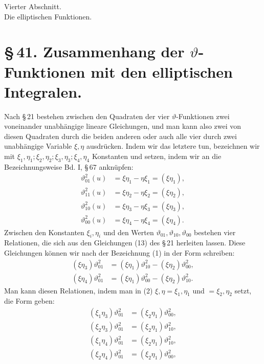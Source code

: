 \documentclass[11pt]{article}
\providecommand{\tht}{\vartheta}
\begin{document}
\begin{center}
{\large Vierter Abschnitt.}\\[0.7em]
{\Large Die elliptischen Funktionen.}
\end{center}

\section*{\S\,41. Zusammenhang der $\vartheta$-Funktionen mit den elliptischen Integralen.}

Nach \S\,21 bestehen zwischen den Quadraten der vier $\vartheta$-Funktionen zwei voneinander unabhängige lineare Gleichungen, und man kann also zwei von diesen Quadraten durch die beiden anderen oder auch alle vier durch zwei unabhängige Variable $\xi,\eta$ ausdrücken. Indem wir das letztere tun, bezeichnen wir mit $\xi_1,\eta_1;\xi_2,\eta_2;\xi_3,\eta_3;\xi_4,\eta_4$ Konstanten und setzen, indem wir an die Bezeichnungsweise Bd. I, \S\,67 anknüpfen:
\begin{equation}
\begin{aligned}
\tht_{01}^{2}(u)&=\xi\eta_1-\eta\xi_1=(\xi\eta_1),\\
\tht_{11}^{2}(u)&=\xi\eta_2-\eta\xi_2=(\xi\eta_2),\\
\tht_{10}^{2}(u)&=\xi\eta_3-\eta\xi_3=(\xi\eta_3),\\
\tht_{00}^{2}(u)&=\xi\eta_4-\eta\xi_4=(\xi\eta_4).
\end{aligned}
\tag{1}
\end{equation}
Zwischen den Konstanten $\xi_i,\eta_i$ und den Werten $\vartheta_{01},\vartheta_{10},\vartheta_{00}$ bestehen vier Relationen, die sich aus den Gleichungen (13) des \S\,21 herleiten lassen. Diese Gleichungen können wir nach der Bezeichnung (1) in der Form schreiben:
\begin{equation}
\begin{aligned}
(\xi\eta_3)\tht_{01}^{2}&=(\xi\eta_1)\tht_{10}^{2}-(\xi\eta_2)\tht_{00}^{2},\\
(\xi\eta_4)\tht_{01}^{2}&=(\xi\eta_1)\tht_{00}^{2}-(\xi\eta_2)\tht_{10}^{2}.
\end{aligned}
\tag{2}
\end{equation}
Man kann diesen Relationen, indem man in (2) $\xi,\eta=\xi_1,\eta_1$ und $=\xi_2,\eta_2$ setzt, die Form geben:
\begin{equation}
\begin{aligned}
(\xi_1\eta_3)\tht_{01}^{2}&=(\xi_2\eta_1)\tht_{00}^{2},\\
(\xi_2\eta_3)\tht_{01}^{2}&=(\xi_2\eta_1)\tht_{10}^{2},\\
(\xi_1\eta_4)\tht_{01}^{2}&=(\xi_2\eta_1)\tht_{10}^{2},\\
(\xi_2\eta_4)\tht_{01}^{2}&=(\xi_2\eta_1)\tht_{00}^{2},
\end{aligned}
\tag{3}
\end{equation}
\end{document}
